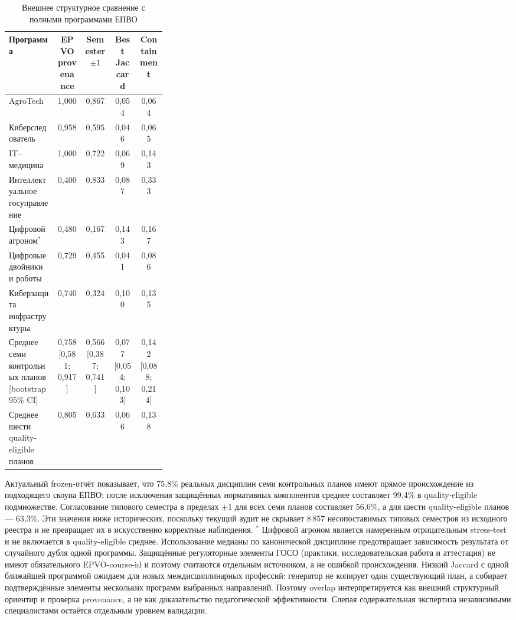 \documentclass[twoside,11pt]{article}
\begin{document}
\begin{table}[H]
\centering
\caption{Внешнее структурное сравнение с полными программами ЕПВО}
\label{tab:external-epvo-validation}
\begin{tabular}{p{0.31\linewidth}cccc}
\toprule
\textbf{Программа} & \textbf{EPVO provenance} & \textbf{Semester $\pm1$} & \textbf{Best Jaccard} & \textbf{Containment}\\
\midrule
AgroTech & 1,000 & 0,867 & 0,054 & 0,064\\
Киберследователь & 0,958 & 0,595 & 0,046 & 0,065\\
IT--медицина & 1,000 & 0,722 & 0,069 & 0,143\\
Интеллектуальное госуправление & 0,400 & 0,833 & 0,087 & 0,333\\
Цифровой агроном$^{*}$ & 0,480 & 0,167 & 0,143 & 0,167\\
Цифровые двойники и роботы & 0,729 & 0,455 & 0,041 & 0,086\\
Киберзащита инфраструктуры & 0,740 & 0,324 & 0,100 & 0,135\\
\midrule
Среднее семи контрольных планов [bootstrap 95\% CI] & 0,758 [0,581; 0,917] & 0,566 [0,387; 0,741] & 0,077 [0,054; 0,103] & 0,142 [0,088; 0,214]\\
Среднее шести quality-eligible планов & 0,805 & 0,633 & 0,066 & 0,138\\
\bottomrule
\end{tabular}
\end{table}

Актуальный frozen-отчёт показывает, что 75,8\% реальных дисциплин семи контрольных планов имеют прямое происхождение из подходящего скоупа ЕПВО; после исключения защищённых нормативных компонентов среднее составляет 99,4\% в quality-eligible подмножестве. Согласование типового семестра в пределах $\pm1$ для всех семи планов составляет 56,6\%, а для шести quality-eligible планов --- 63,3\%. Эти значения ниже исторических, поскольку текущий аудит не скрывает 8\,857 несопоставимых типовых семестров из исходного реестра и не превращает их в искусственно корректные наблюдения. $^{*}$ Цифровой агроном является намеренным отрицательным stress-test и не включается в quality-eligible среднее. Использование медианы по канонической дисциплине предотвращает зависимость результата от случайного дубля одной программы. Защищённые регуляторные элементы ГОСО (практики, исследовательская работа и аттестация) не имеют обязательного EPVO-course-id и поэтому считаются отдельным источником, а не ошибкой происхождения. Низкий Jaccard с одной ближайшей программой ожидаем для новых междисциплинарных профессий: генератор не копирует один существующий план, а собирает подтверждённые элементы нескольких программ выбранных направлений. Поэтому overlap интерпретируется как внешний структурный ориентир и проверка provenance, а не как доказательство педагогической эффективности. Слепая содержательная экспертиза независимыми специалистами остаётся отдельным уровнем валидации.
\end{document}
